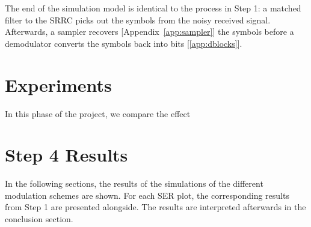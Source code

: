 \documentclass[]{article}
\begin{document}
The end of the simulation model is identical to the process in Step 1: a matched filter to the SRRC picks out the symbols from the noisy received signal.  Afterwards, a sampler recovers [Appendix~\ref{app:sampler}] the symbols before a demodulator converts the symbols back into bits [\ref{app:dblocks}].  

\section{Experiments}
\label{sec:experiments}
In this phase of the project, we compare the effect 

\section{Step 4 Results}
\label{sec:results}
In the following sections, the results of the simulations of the different modulation schemes are shown.  For each SER plot, the corresponding results from Step 1 are presented alongside.  The results are interpreted afterwards in the conclusion section.
\end{document}
